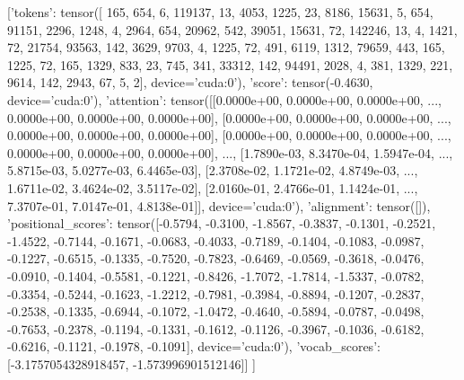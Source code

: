         [{'tokens': tensor([   165,    654,      6, 119137,     13,   4053,   1225,     23,   8186,
         15631,      5,    654,  91151,   2296,   1248,      4,   2964,    654,
         20962,    542,  39051,  15631,     72, 142246,     13,      4,   1421,
            72,  21754,  93563,    142,   3629,   9703,      4,   1225,     72,
           491,   6119,   1312,  79659,    443,    165,   1225,     72,    165,
          1329,    833,     23,    745,    341,  33312,    142,  94491,   2028,
             4,    381,   1329,    221,   9614,    142,   2943,     67,      5,
             2], device='cuda:0'), 'score': tensor(-0.4630, device='cuda:0'), 'attention': tensor([[0.0000e+00, 0.0000e+00, 0.0000e+00,  ..., 0.0000e+00, 0.0000e+00,
         0.0000e+00],
        [0.0000e+00, 0.0000e+00, 0.0000e+00,  ..., 0.0000e+00, 0.0000e+00,
         0.0000e+00],
        [0.0000e+00, 0.0000e+00, 0.0000e+00,  ..., 0.0000e+00, 0.0000e+00,
         0.0000e+00],
        ...,
        [1.7890e-03, 8.3470e-04, 1.5947e-04,  ..., 5.8715e-03, 5.0277e-03,
         6.4465e-03],
        [2.3708e-02, 1.1721e-02, 4.8749e-03,  ..., 1.6711e-02, 3.4624e-02,
         3.5117e-02],
        [2.0160e-01, 2.4766e-01, 1.1424e-01,  ..., 7.3707e-01, 7.0147e-01,
         4.8138e-01]], device='cuda:0'), 'alignment': tensor([]), 'positional_scores': tensor([-0.5794, -0.3100, -1.8567, -0.3837, -0.1301, -0.2521, -1.4522, -0.7144,
        -0.1671, -0.0683, -0.4033, -0.7189, -0.1404, -0.1083, -0.0987, -0.1227,
        -0.6515, -0.1335, -0.7520, -0.7823, -0.6469, -0.0569, -0.3618, -0.0476,
        -0.0910, -0.1404, -0.5581, -0.1221, -0.8426, -1.7072, -1.7814, -1.5337,
        -0.0782, -0.3354, -0.5244, -0.1623, -1.2212, -0.7981, -0.3984, -0.8894,
        -0.1207, -0.2837, -0.2538, -0.1335, -0.6944, -0.1072, -1.0472, -0.4640,
        -0.5894, -0.0787, -0.0498, -0.7653, -0.2378, -0.1194, -0.1331, -0.1612,
        -0.1126, -0.3967, -0.1036, -0.6182, -0.6216, -0.1121, -0.1978, -0.1091],
       device='cuda:0'), 'vocab_scores': [-3.1757054328918457, -1.573996901512146]}]
    ]
